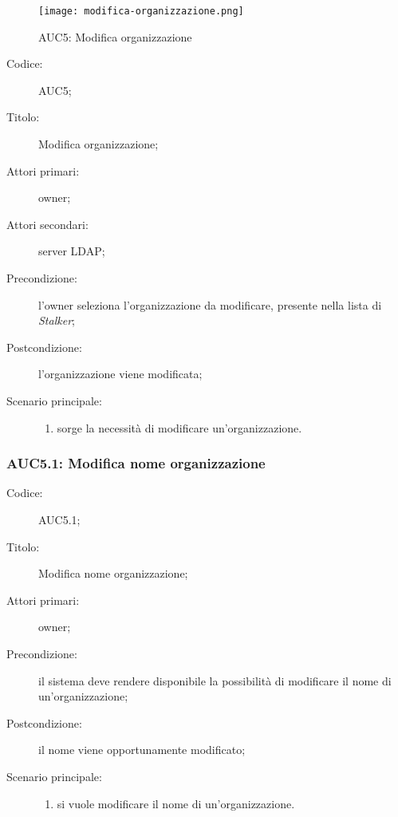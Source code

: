\documentclass[../../../analisi-dei-requisiti.tex]{subfiles}
\begin{document}
\begin{figure}[H]
  \centering
  \texttt{[image: modifica-organizzazione.png]}
  \caption{AUC5: Modifica organizzazione}%
  \label{fig:AUC5}
\end{figure}

\begin{description}
  \item[Codice:] AUC5;
  \item[Titolo:] Modifica organizzazione;
  \item[Attori primari:] owner;
  \item[Attori secondari:] server LDAP\@;
  \item[Precondizione:] l'owner seleziona l'organizzazione da modificare, presente nella lista di \emph{Stalker};
  \item[Postcondizione:] l'organizzazione viene modificata;
  \item[Scenario principale:]
        \begin{enumerate}
          \item sorge la necessità di modificare un'organizzazione.
        \end{enumerate}
\end{description}

\subsubsection{AUC5.1: Modifica nome organizzazione}%
\label{subs:AUC5.1}
\begin{description}
  \item[Codice:] AUC5.1;
  \item[Titolo:] Modifica nome organizzazione;
  \item[Attori primari:] owner;
  \item[Precondizione:] il sistema deve rendere disponibile la possibilità di modificare il nome di un'organizzazione;
  \item[Postcondizione:] il nome viene opportunamente modificato;
  \item[Scenario principale:]
        \begin{enumerate}
          \item si vuole modificare il nome di un'organizzazione.
        \end{enumerate}
\end{description}
\end{document}
